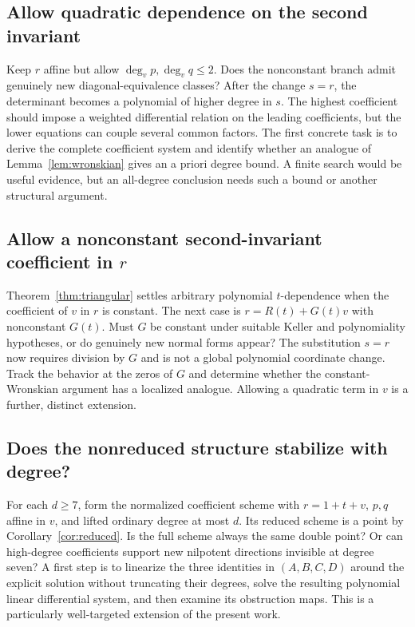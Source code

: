 \documentclass[11pt,a4paper]{article}
\numberwithin{equation}{section}
\theoremstyle{definition}
\theoremstyle{remark}
\begin{document}
\subsection{Allow quadratic dependence on the second invariant}

Keep $r$ affine but allow $\deg_vp,\deg_vq\le2$. Does the nonconstant
branch admit genuinely new diagonal-equivalence classes? After the change
$s=r$, the determinant becomes a polynomial of higher degree in $s$.
The highest coefficient should impose a weighted differential relation on
the leading coefficients, but the lower equations can couple several
common factors. The first concrete task is to derive the complete
coefficient system and identify whether an analogue of
Lemma~\ref{lem:wronskian} gives an a priori degree bound. A finite search
would be useful evidence, but an all-degree conclusion needs such a bound
or another structural argument.

\subsection{\texorpdfstring{Allow a nonconstant second-invariant coefficient in $r$}{Allow a nonconstant second-invariant coefficient in r}}

Theorem~\ref{thm:triangular} settles arbitrary polynomial $t$-dependence
when the coefficient of $v$ in $r$ is constant. The next case is
$r=R(t)+G(t)v$ with nonconstant $G(t)$. Must $G$ be constant under suitable
Keller and polynomiality hypotheses, or do genuinely new normal forms
appear? The substitution $s=r$ now requires division by $G$ and is not a
global polynomial coordinate change. Track the behavior at the zeros of
$G$ and determine whether the constant-Wronskian argument has a localized
analogue. Allowing a quadratic term in $v$ is a further, distinct extension.

\subsection{Does the nonreduced structure stabilize with degree?}

For each $d\ge7$, form the normalized coefficient scheme with
$r=1+t+v$, $p,q$ affine in $v$, and lifted ordinary degree at most $d$.
Its reduced scheme is a point by Corollary~\ref{cor:reduced}. Is the full
scheme always the same double point? Or can high-degree coefficients
support new nilpotent directions invisible at degree seven? A first step
is to linearize the three identities in $(A,B,C,D)$ around the explicit
solution without truncating their degrees, solve the resulting polynomial
linear differential system, and then examine its obstruction maps.
This is a particularly well-targeted extension of the present work.
\end{document}
